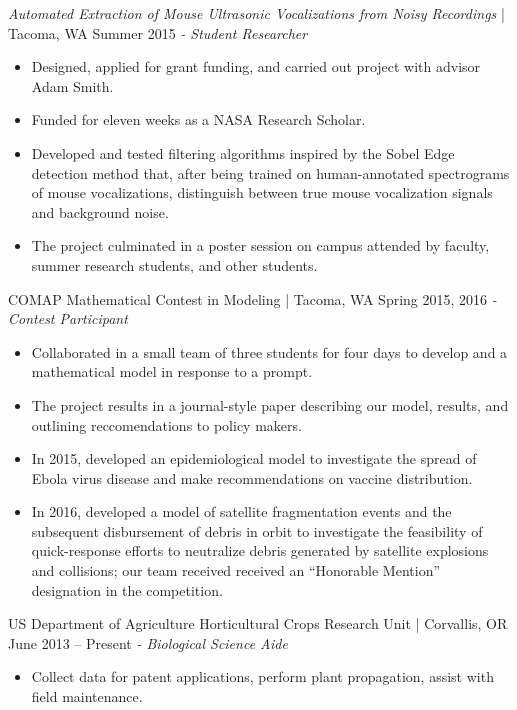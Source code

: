 \documentclass[letter]{res}
\begin{document}
\begin{resume}
\textit{Automated Extraction of Mouse Ultrasonic Vocalizations from Noisy Recordings} | Tacoma, WA \hfill Summer 2015 \newline 
\textit{- Student Researcher} \\
  \vspace{-4.5mm}
 \begin{itemize}
 \item Designed, applied for grant funding, and carried out project with advisor Adam Smith.
 \item Funded for eleven weeks as a NASA Research Scholar.
 \item Developed and tested filtering algorithms inspired by the Sobel Edge detection method that, after being trained on human-annotated spectrograms of mouse vocalizations, distinguish between true mouse vocalization signals and background noise.
 \item The project culminated in a poster session on campus attended by faculty, summer research students, and other students. 
 \end{itemize}
  \vspace{-3.5mm}
  
COMAP Mathematical Contest in Modeling | Tacoma, WA \hfill Spring 2015, 2016 \newline 
\textit{- Contest Participant} \\
  \vspace{-4.5mm}
 \begin{itemize}
 \item Collaborated in a small team of three students for four days to develop and a mathematical model in response to a prompt.
 \item The project results in a journal-style paper describing our model, results, and outlining reccomendations to policy makers.
 \item In 2015, developed an epidemiological model to investigate the spread of Ebola virus disease and make recommendations on vaccine distribution.
 \item In 2016, developed a model of satellite fragmentation events and the subsequent disbursement of debris in orbit to investigate the feasibility of quick-response efforts to neutralize debris generated by satellite explosions and collisions; our team received received an ``Honorable Mention'' designation in the competition.
 \end{itemize}
  \vspace{-3.5mm}

US Department of Agriculture Horticultural Crops Research Unit | Corvallis, OR  \hfill  June 2013 – Present \newline
\textit{- Biological Science Aide}\\
  \vspace{-4.5mm}
 \begin{itemize}
 \item Collect data for patent applications, perform plant propagation, assist with field maintenance.
 \end{itemize}
  \vspace{-3.5mm}
 

\end{resume}
\end{document}
